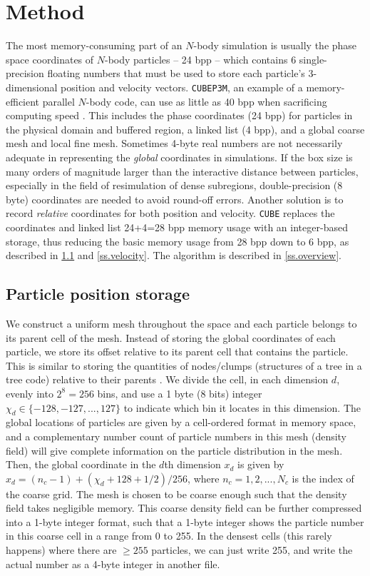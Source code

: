 \documentclass[10pt,twocolumn,preprint]{emulateapj}
\begin{document}
\section{Method}\label{s.method}
The most memory-consuming part of an $N$-body simulation is usually the phase space coordinates of $N$-body particles -- 24 bpp -- which contains 6 single-precision floating numbers that must be used to store each particle's 3-dimensional position and velocity vectors. {\tt CUBEP3M}, an example of a memory-efficient parallel $N$-body code, can use as little as 40 bpp when sacrificing computing speed \citep{2013MNRAS.436..540H}. This includes the phase coordinates (24 bpp) for particles in the physical domain and buffered region, a linked list (4 bpp), and a global coarse mesh and local fine mesh. Sometimes 4-byte real numbers are not necessarily adequate in representing the {\it global} coordinates in simulations. If the box size is many orders of magnitude larger than the interactive distance between particles, especially in the field of resimulation of dense subregions, double-precision (8 byte) coordinates are needed to avoid round-off errors. Another solution is to record {\it relative} coordinates for both position and velocity. {\tt CUBE} replaces the coordinates and linked list 24+4=28 bpp memory usage with an integer-based storage, thus reducing the basic memory usage from 28 bpp down to 6 bpp, as described in \ref{ss.position} and \ref{ss.velocity}. The algorithm is described in \ref{ss.overview}.

\subsection{Particle position storage}\label{ss.position}
We construct a uniform mesh throughout the space and each particle belongs to its parent cell of the mesh. Instead of storing the global coordinates of each particle, we store its offset relative to its parent cell that contains the particle. This is similar to storing the quantities of nodes/clumps (structures of a tree in a tree code) relative to their parents \citep{1985SJSSC...6...85A}. We divide the cell, in each dimension $d$, evenly into $2^8=256$ bins, and use a 1 byte (8 bits) integer $\chi_d \in \{-128,-127,...,127\}$ to indicate which bin it locates in this dimension. The global locations of particles are given by a cell-ordered format in memory space, and a complementary number count of particle numbers in this mesh (density field) will give complete information on the particle distribution in the mesh. Then, the global coordinate in the $d$th dimension $x_d$ is given by $x_d=(n_c-1)+(\chi_d+128+1/2)/256$, where $n_c=1,2,...,N_c$ is the index of the coarse grid. The mesh is chosen to be coarse enough such that the density field takes negligible memory. This coarse density field can be further compressed into a 1-byte integer format, such that a 1-byte integer shows the particle number in this coarse cell in a range from 0 to 255. In the densest cells (this rarely happens) where there are $\ge 255$ particles, we can just write 255, and write the actual number as a 4-byte integer in another file.
\end{document}
